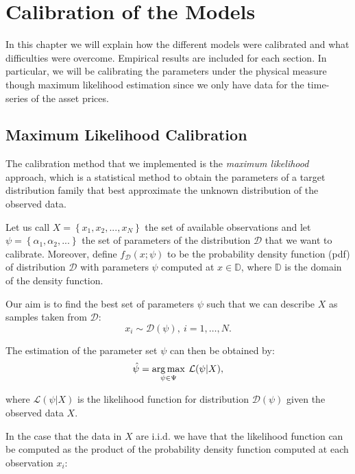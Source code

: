 \chapter{Calibration of the Models}
\label{chpr:calibration}

In this chapter we will explain how the different models were calibrated and what difficulties were overcome. Empirical results are included for each section.
In particular, we will be calibrating the parameters under the physical measure though maximum likelihood estimation since we only have data for the time-series of the asset prices. 

\bigskip

\section{Maximum Likelihood Calibration}
\label{sec:calib_overview}
The calibration method that we implemented is the \textit{maximum likelihood} approach, which is a statistical method to obtain the parameters of a target distribution family that best approximate the unknown distribution of the observed data.

Let us call $X = \left\lbrace x_1, x_2, ... , x_N \right\rbrace$ the set of available observations and let $\psi= \left\lbrace \alpha_1, \alpha_2, ... \right\rbrace $ the set of parameters of the distribution $ \mathcal{D}$ that we want to calibrate.
Moreover, define $f_\mathcal{D} (x ; \psi)$ to be the probability density function (pdf) of distribution $\mathcal{D}$ with parameters $\psi$ computed at $x \in \mathbb{D}$, where $\mathbb{D}$ is the domain of the density function.

Our aim is to find the best set of parameters $\psi$ such that we can describe $X$ as samples taken from $\mathcal{D}$:
\begin{equation}
x_i \sim \mathcal{D} (\psi), \: i = 1, \dots, N.
\end{equation}

The estimation of the parameter set $\psi$ can then be obtained by:
\begin{equation}
	\hat{\psi} = \operatorname*{arg\,max}_{\psi \in \Psi} \:\mathcal{L}(\psi |  X),
\end{equation}

where $\mathcal{L}(\psi |  X)$ is the likelihood function for distribution $\mathcal{D}(\psi)$ given the observed data $X$.

In the case that the data in $X$ are i.i.d. we have that the likelihood function can be computed as the product of the probability density function computed at each observation $x_i$:

